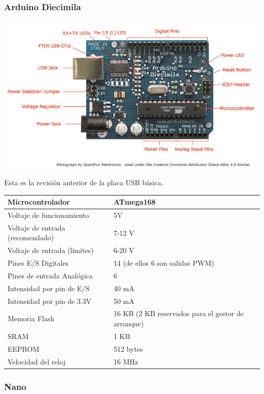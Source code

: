 \documentclass[12pt,a4papert,woside,openright,titlepage,final]{book}
\begin{document}
\subsubsection{Arduino Diecimila}

\includegraphics[scale=0.6]{ArduinoDiecimilaComponents.jpg}

 Esta es la revisión anterior de la placa USB básica.

\begin{tabular}{||l | l ||}
\hline
\hline
Microcontrolador & ATmega168\\
\hline
Voltaje de funcionamiento & 5V\\
\hline
Voltaje de entrada (recomendado) & 7-12 V\\
\hline
Voltaje de entrada (limites) & 6-20 V\\
\hline
Pines E/S Digitales & 14 (de ellos 6 son salidas PWM)\\
\hline
Pines de entrada Analógica & 6\\
\hline
Intensidad por pin de E/S & 40 mA\\
\hline
Intensidad por pin de 3.3V & 50 mA\\
\hline
Memoria Flash & 16 KB (2 KB reservados para el gestor de arranque)\\
\hline
SRAM & 1 KB\\
\hline
EEPROM & 512 bytes\\
\hline
Velocidad del reloj & 16 MHz\\
\hline
\hline
\end{tabular}

\subsubsection{Nano}
\end{document}
